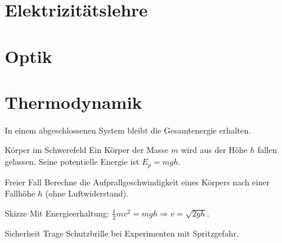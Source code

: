 \documentclass[11pt,a4paper,oneside]{article}
\begin{document}
	\section{Elektrizitätslehre}
	
	\section{Optik}
	
	\section{Thermodynamik}
	
	\newpage
	
	
	
	
	
	\begin{theo}
		In einem abgeschlossenen System bleibt die Gesamtenergie erhalten.
	\end{theo}
	
	\begin{exem}{Körper im Schwerefeld}
		Ein Körper der Masse $m$ wird aus der Höhe $h$ fallen gelassen. Seine potentielle Energie ist $E_p = mgh$.
	\end{exem}
	
	\begin{aufgabe}{Freier Fall}
		Berechne die Aufprallgeschwindigkeit eines Körpers nach einer Fallhöhe $h$ (ohne Luftwiderstand).
	\end{aufgabe}
	
	\begin{loesung}{Skizze}
		Mit Energieerhaltung: $\frac12 mv^2 = mgh \Rightarrow v=\sqrt{2gh}$.
	\end{loesung}
	
	\begin{infobox}{Sicherheit}
		Trage Schutzbrille bei Experimenten mit Spritzgefahr.
	\end{infobox}
	
\end{document}
